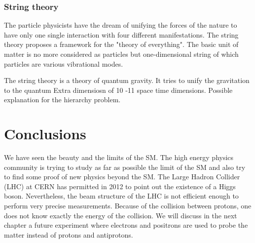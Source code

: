       \subsubsection{String theory}

      The particle physicists have the dream of unifying the forces of the nature to have only one single interaction with four different manifestations.
      The string theory proposes a framework for the "theory of everything".
      The basic unit of matter is no more considered as particles but one-dimensional string of which particles are various vibrational modes.

      The string theory is a theory of quantum gravity.
      It tries to unify the gravitation to the quantum 
      Extra dimensiosn of 10 -11 space time dimensions.
      Possible explanation for the hierarchy problem.

    \section{Conclusions}

    We have seen the beauty and the limits of the SM.
    The high energy physics community is trying to study as far as possible the limit of the SM and also try to find some proof of new physics beyond the SM.
    The Large Hadron Collider (LHC) at CERN has permitted in 2012 to point out the existence of a Higgs boson.  
    Nevertheless, the beam structure of the LHC is not efficient enough to perform very precise measurements.
    Because of the collision between protons, one does not know exactly the energy of the collision.
    We will discuss in the next chapter a future experiment where electrons and positrons are used to probe the matter instead of protons and antiprotons.
